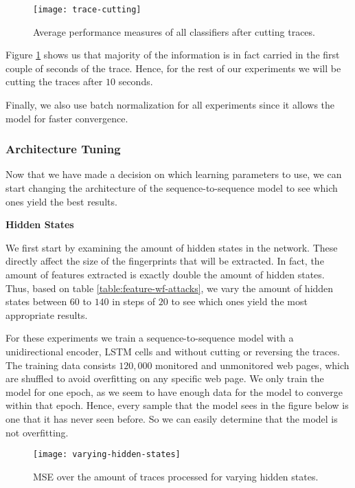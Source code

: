 \begin{figure}[ht]
  \centering
  \texttt{[image: trace-cutting]}
  \caption{Average performance measures of all classifiers after cutting traces.}
  \label{fig:trace-cutting}
\end{figure}

Figure \ref{fig:trace-cutting} shows us that majority of the information is in fact carried in the first couple of seconds of the trace.
Hence, for the rest of our experiments we will be cutting the traces after $10$ seconds.

Finally, we also use batch normalization for all experiments since it allows the model for faster convergence.

\subsubsection{Architecture Tuning}

Now that we have made a decision on which learning parameters to use, we can start changing the architecture of the sequence-to-sequence model to see which ones yield the best results.

\noindent
\textbf{Hidden States}

We first start by examining the amount of hidden states in the network.
These directly affect the size of the fingerprints that will be extracted.
In fact, the amount of features extracted is exactly double the amount of hidden states.
Thus, based on table \ref{table:feature-wf-attacks}, we vary the amount of hidden states between $60$ to $140$ in steps of $20$ to see which ones yield the most appropriate results.

For these experiments we train a sequence-to-sequence model with a unidirectional encoder, LSTM cells and without cutting or reversing the traces.
The training data consists $120,000$ monitored and unmonitored web pages, which are shuffled to avoid overfitting on any specific web page.
We only train the model for one epoch, as we seem to have enough data for the model to converge within that epoch.
Hence, every sample that the model sees in the figure below is one that it has never seen before.
So we can easily determine that the model is not overfitting.

\begin{figure}[ht]
  \centering
  \texttt{[image: varying-hidden-states]}
  \caption{MSE over the amount of traces processed for varying hidden states.}
  \label{fig:varying-hidden-states}
\end{figure}

